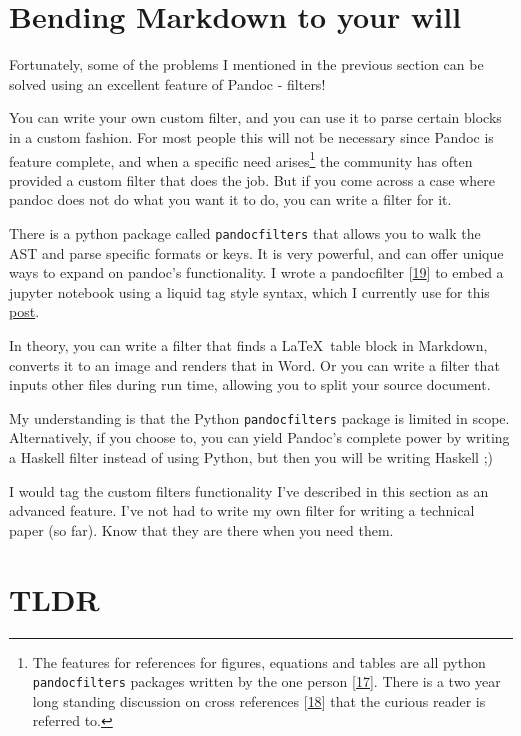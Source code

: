 \documentclass[journal,10pt,final]{IEEEtran}
\begin{document}
\section{Bending Markdown to your
will}\label{bending-markdown-to-your-will}

Fortunately, some of the problems I mentioned in the previous section
can be solved using an excellent feature of Pandoc - filters!

You can write your own custom filter, and you can use it to parse
certain blocks in a custom fashion. For most people this will not be
necessary since Pandoc is feature complete, and when a specific need
arises\footnote{The features for references for figures, equations and
  tables are all python \texttt{pandocfilters} packages written by the
  one person {[}\protect\hyperlink{ref-duckux5fgithub}{17}{]}. There is
  a two year long standing discussion on cross references
  {[}\protect\hyperlink{ref-ux5fpandoc-1}{18}{]} that the curious reader
  is referred to.} the community has often provided a custom filter that
does the job. But if you come across a case where pandoc does not do
what you want it to do, you can write a filter for it.

There is a python package called \texttt{pandocfilters} that allows you
to walk the AST and parse specific formats or keys. It is very powerful,
and can offer unique ways to expand on pandoc's functionality. I wrote a
pandocfilter {[}\protect\hyperlink{ref-krishnamurthyux5fgithub-1}{19}{]}
to embed a jupyter notebook using a liquid tag style syntax, which I
currently use for this
\href{https://kdheepak.com/blog/active-reactive-and-apparent-power.html}{post}.

In theory, you can write a filter that finds a \LaTeX~table block in
Markdown, converts it to an image and renders that in Word. Or you can
write a filter that inputs other files during run time, allowing you to
split your source document.

My understanding is that the Python \texttt{pandocfilters} package is
limited in scope. Alternatively, if you choose to, you can yield
Pandoc's complete power by writing a Haskell filter instead of using
Python, but then you will be writing Haskell ;)

I would tag the custom filters functionality I've described in this
section as an advanced feature. I've not had to write my own filter for
writing a technical paper (so far). Know that they are there when you
need them.

\section{TLDR}\label{tldr}
\end{document}
